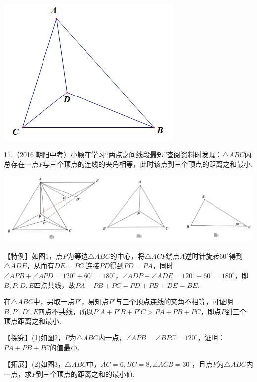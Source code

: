 \documentclass[10pt]{ctexart}
\begin{document}
\begin{center}
	\includegraphics[scale=0.5]{figure/feimadian28}
\end{center}

\vspace{1cm}

\begin{shaded}
11.（2016 朝阳中考）小颖在学习“两点之间线段最短”查阅资料时发现：$\triangle ABC$内总存在一点$P$与三个顶点的连线的夹角相等，此时该点到三个顶点的距离之和最小.
\end{shaded}

\begin{center}
	\includegraphics[scale=0.5]{figure/feimadian22}
\end{center}

\begin{shaded}
【特例】如图1，点$P$为等边$\triangle ABC$的中心，将$\triangle ACP$绕点$A$逆时针旋转$60^\circ$得到$\triangle ADE$，从而有$DE=PC$.连接$PD$得到$PD=PA$，同时$\angle APB+\angle APD=120^\circ+60^\circ=180^\circ$，$\angle ADP+\angle ADE=120^\circ+60^\circ=180^\circ$，即$B,P,D,E$四点共线，故$PA+PB+PC=PD+PB+DE=BE$.

在$\triangle ABC$中，另取一点$P'$，易知点$P'$与三个顶点连线的夹角不相等，可证明$B,P',D',E$四点不共线，所以$P'A+P'B+P'C>PA+PB+PC$，即点$P$到三个顶点距离之和最小.

【探究】(1)如图2，$P$为$\triangle ABC$内一点，$\angle APB=\angle BPC=120^\circ$，证明：$PA+PB+PC$的值最小.

【拓展】(2)如图3，$\triangle ABC$中，$AC=6,BC=8,\angle ACB=30^\circ$，且点$P$为$\triangle ABC$内一点，求$P$到三个顶点的距离之和的最小值.
\end{shaded}
\end{document}
